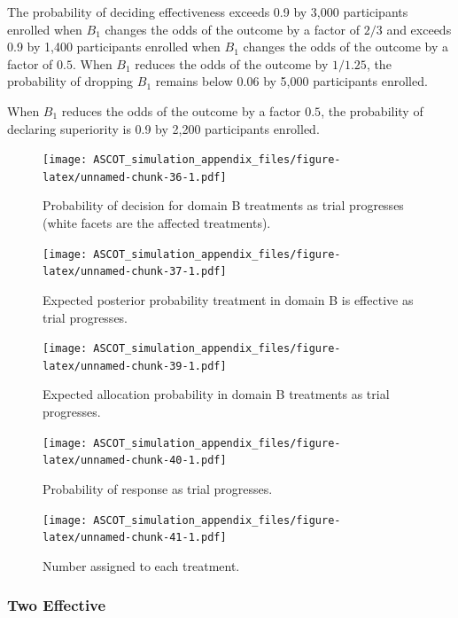 \documentclass[
]{article}
\begin{document}
The probability of deciding effectiveness exceeds 0.9 by 3,000 participants enrolled when \(B_1\) changes the odds of the outcome by a factor of \(2/3\) and exceeds 0.9 by 1,400 participants enrolled when \(B_1\) changes the odds of the outcome by a factor of \(0.5\).
When \(B_1\) reduces the odds of the outcome by \(1/1.25\), the probability of dropping \(B_1\) remains below 0.06 by 5,000 participants enrolled.

When \(B_1\) reduces the odds of the outcome by a factor \(0.5\), the probability of declaring superiority is 0.9 by 2,200 participants enrolled.

\begin{figure}
\centering
\texttt{[image: ASCOT\_simulation\_appendix\_files/figure-latex/unnamed-chunk-36-1.pdf]}
\caption{\label{fig:unnamed-chunk-36}Probability of decision for domain B treatments as trial progresses (white facets are the affected treatments).}
\end{figure}

\begin{figure}
\centering
\texttt{[image: ASCOT\_simulation\_appendix\_files/figure-latex/unnamed-chunk-37-1.pdf]}
\caption{\label{fig:unnamed-chunk-37}Expected posterior probability treatment in domain B is effective as trial progresses.}
\end{figure}

\begin{figure}
\centering
\texttt{[image: ASCOT\_simulation\_appendix\_files/figure-latex/unnamed-chunk-39-1.pdf]}
\caption{\label{fig:unnamed-chunk-39}Expected allocation probability in domain B treatments as trial progresses.}
\end{figure}

\begin{figure}
\centering
\texttt{[image: ASCOT\_simulation\_appendix\_files/figure-latex/unnamed-chunk-40-1.pdf]}
\caption{\label{fig:unnamed-chunk-40}Probability of response as trial progresses.}
\end{figure}

\begin{figure}
\centering
\texttt{[image: ASCOT\_simulation\_appendix\_files/figure-latex/unnamed-chunk-41-1.pdf]}
\caption{\label{fig:unnamed-chunk-41}Number assigned to each treatment.}
\end{figure}

\clearpage

\hypertarget{two-effective}{%
\subsubsection{Two Effective}\label{two-effective}}
\end{document}
